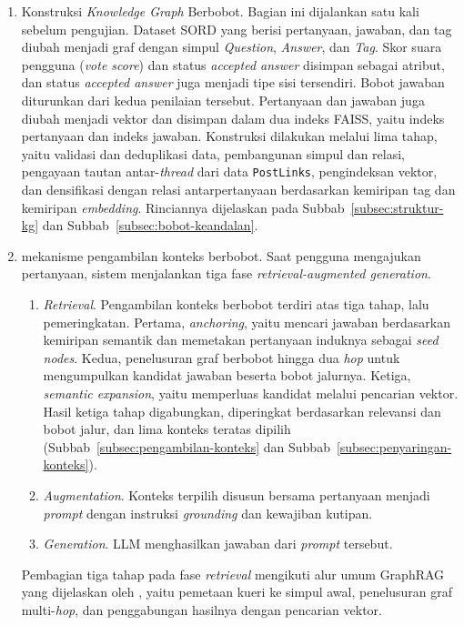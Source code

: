 \begin{enumerate}
    \item Konstruksi \emph{Knowledge Graph} Berbobot.
    Bagian ini dijalankan satu kali sebelum pengujian. Dataset SORD \autocite{Fatima2026} yang berisi pertanyaan, jawaban, dan tag diubah menjadi graf dengan simpul \emph{Question}, \emph{Answer}, dan \emph{Tag}. Skor suara pengguna (\emph{vote score}) dan status \emph{accepted answer} disimpan sebagai atribut, dan status \emph{accepted answer} juga menjadi tipe sisi tersendiri. Bobot jawaban diturunkan dari kedua penilaian tersebut. Pertanyaan dan jawaban juga diubah menjadi vektor dan disimpan dalam dua indeks FAISS, yaitu indeks pertanyaan dan indeks jawaban. Konstruksi dilakukan melalui lima tahap, yaitu validasi dan deduplikasi data, pembangunan simpul dan relasi, pengayaan tautan antar-\emph{thread} dari data \texttt{PostLinks}, pengindeksan vektor, dan densifikasi dengan relasi antarpertanyaan berdasarkan kemiripan tag dan kemiripan \emph{embedding}. Rinciannya dijelaskan pada Subbab~\ref{subsec:struktur-kg} dan Subbab~\ref{subsec:bobot-keandalan}.

    \item mekanisme pengambilan konteks berbobot.
    Saat pengguna mengajukan pertanyaan, sistem menjalankan tiga fase \emph{retrieval-augmented generation}.
    \begin{enumerate}
        \item \emph{Retrieval}. Pengambilan konteks berbobot terdiri atas tiga tahap, lalu pemeringkatan. Pertama, \emph{anchoring}, yaitu mencari jawaban berdasarkan kemiripan semantik dan memetakan pertanyaan induknya sebagai \emph{seed nodes}. Kedua, penelusuran graf berbobot hingga dua \emph{hop} untuk mengumpulkan kandidat jawaban beserta bobot jalurnya. Ketiga, \emph{semantic expansion}, yaitu memperluas kandidat melalui pencarian vektor. Hasil ketiga tahap digabungkan, diperingkat berdasarkan relevansi dan bobot jalur, dan lima konteks teratas dipilih (Subbab~\ref{subsec:pengambilan-konteks} dan Subbab~\ref{subsec:penyaringan-konteks}).
        \item \emph{Augmentation}. Konteks terpilih disusun bersama pertanyaan menjadi \emph{prompt} dengan instruksi \emph{grounding} dan kewajiban kutipan.
        \item \emph{Generation}. LLM menghasilkan jawaban dari \emph{prompt} tersebut.
    \end{enumerate}

    Pembagian tiga tahap pada fase \emph{retrieval} mengikuti alur umum GraphRAG yang dijelaskan oleh \textcite{Kamalipour2026}, yaitu pemetaan kueri ke simpul awal, penelusuran graf multi-\emph{hop}, dan penggabungan hasilnya dengan pencarian vektor.
\end{enumerate}

